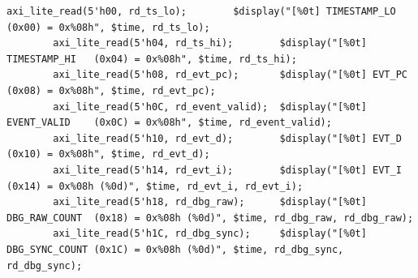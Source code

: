 \begin{lstlisting}[style=verilogstyle, basicstyle=\ttfamily\footnotesize, caption={Código fuente del subsistema \texttt{tb\_ibex\_bram\_subsystem.sv}}, label={code:tb_ibex_bram_subsystem.sv}]
        axi_lite_read(5'h00, rd_ts_lo);        $display("[%0t] TIMESTAMP_LO   (0x00) = 0x%08h", $time, rd_ts_lo);
        axi_lite_read(5'h04, rd_ts_hi);        $display("[%0t] TIMESTAMP_HI   (0x04) = 0x%08h", $time, rd_ts_hi);
        axi_lite_read(5'h08, rd_evt_pc);       $display("[%0t] EVT_PC         (0x08) = 0x%08h", $time, rd_evt_pc);
        axi_lite_read(5'h0C, rd_event_valid);  $display("[%0t] EVENT_VALID    (0x0C) = 0x%08h", $time, rd_event_valid);
        axi_lite_read(5'h10, rd_evt_d);        $display("[%0t] EVT_D          (0x10) = 0x%08h", $time, rd_evt_d);
        axi_lite_read(5'h14, rd_evt_i);        $display("[%0t] EVT_I          (0x14) = 0x%08h (%0d)", $time, rd_evt_i, rd_evt_i);
        axi_lite_read(5'h18, rd_dbg_raw);      $display("[%0t] DBG_RAW_COUNT  (0x18) = 0x%08h (%0d)", $time, rd_dbg_raw, rd_dbg_raw);
        axi_lite_read(5'h1C, rd_dbg_sync);     $display("[%0t] DBG_SYNC_COUNT (0x1C) = 0x%08h (%0d)", $time, rd_dbg_sync, rd_dbg_sync);


\end{lstlisting}
